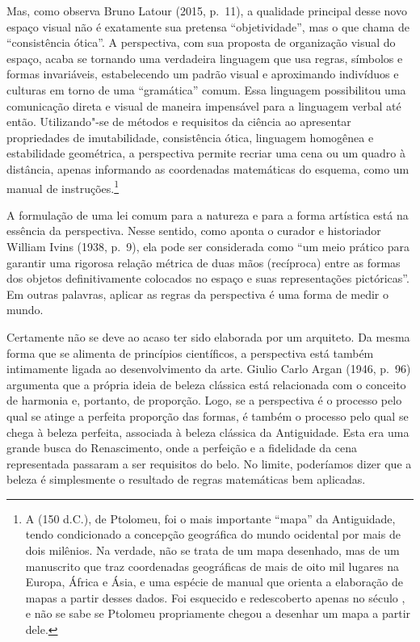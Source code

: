Mas, como observa Bruno Latour (2015, p.~11), a qualidade principal
desse novo espaço visual não é exatamente sua pretensa ``objetividade'',
mas o que chama de ``consistência ótica''. A perspectiva, com sua
proposta de organização visual do espaço, acaba se tornando uma
verdadeira linguagem que usa regras, símbolos e formas invariáveis,
estabelecendo um padrão visual e aproximando indivíduos e culturas em
torno de uma ``gramática'' comum. Essa linguagem possibilitou uma
comunicação direta e visual de maneira impensável para a linguagem
verbal até então. Utilizando"-se de métodos e requisitos da ciência ao
apresentar propriedades de imutabilidade, consistência ótica, linguagem
homogênea e estabilidade geométrica, a perspectiva permite recriar uma
cena ou um quadro à distância, apenas informando as coordenadas
matemáticas do esquema, como um manual de instruções.\footnote{A
  {} (150 d.C.), de Ptolomeu, foi o mais importante
  ``mapa'' da Antiguidade, tendo condicionado a concepção geográfica do
  mundo ocidental por mais de dois milênios. Na verdade, não se trata de
  um mapa desenhado, mas de um manuscrito que traz coordenadas
  geográficas de mais de oito mil lugares na Europa, África e Ásia, e
  uma espécie de manual que orienta a elaboração de mapas a partir
  desses dados. Foi esquecido e redescoberto apenas no século , e
  não se sabe se Ptolomeu propriamente chegou a desenhar um mapa a
  partir dele.}

A formulação de uma lei comum para a natureza e para a forma artística
está na essência da perspectiva. Nesse sentido, como aponta o curador e
historiador William Ivins (1938, p.~9), ela pode ser considerada como
``um meio prático para garantir uma rigorosa relação métrica de duas
mãos (recíproca) entre as formas dos objetos definitivamente colocados
no espaço e suas representações pictóricas''. Em outras palavras,
aplicar as regras da perspectiva é uma forma de medir o mundo.

Certamente não se deve ao acaso ter sido elaborada por um arquiteto. Da
mesma forma que se alimenta de princípios científicos, a perspectiva
está também intimamente ligada ao desenvolvimento da arte. Giulio Carlo
Argan (1946, p.~96) argumenta que a própria ideia de beleza clássica
está relacionada com o conceito de harmonia e, portanto, de proporção.
Logo, se a perspectiva é o processo pelo qual se atinge a perfeita
proporção das formas, é também o processo pelo qual se chega à beleza
perfeita, associada à beleza clássica da Antiguidade. Esta era uma
grande busca do Renascimento, onde a perfeição e a fidelidade da cena
representada passaram a ser requisitos do belo. No limite, poderíamos
dizer que a beleza é simplesmente o resultado de regras matemáticas bem
aplicadas.

